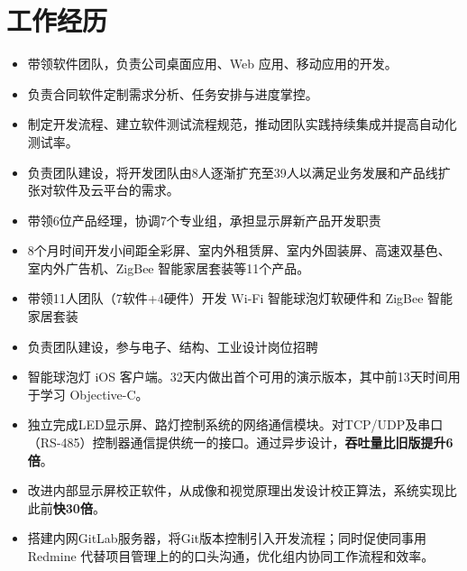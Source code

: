 \documentclass[11pt,a4paper]{moderncv/moderncv}
\begin{document}
\maketitle


\section{工作经历}

{
\begin{itemize}
	\item 带领软件团队，负责公司桌面应用、Web 应用、移动应用的开发。
	\item 负责合同软件定制需求分析、任务安排与进度掌控。
	\item 制定开发流程、建立软件测试流程规范，推动团队实践持续集成并提高自动化测试率。
	\item 负责团队建设，将开发团队由8人逐渐扩充至39人以满足业务发展和产品线扩张对软件及云平台的需求。
\end{itemize}
}

{
\begin{itemize}
	\item 带领6位产品经理，协调7个专业组，承担显示屏新产品开发职责
	\item 8个月时间开发小间距全彩屏、室内外租赁屏、室内外固装屏、高速双基色、室内外广告机、ZigBee 智能家居套装等11个产品。
	\item 带领11人团队（7软件+4硬件）开发 Wi-Fi 智能球泡灯软硬件和 ZigBee 智能家居套装
	\item 负责团队建设，参与电子、结构、工业设计岗位招聘
\end{itemize}
}

{
\begin{itemize}
	\item 智能球泡灯 iOS 客户端。32天内做出首个可用的演示版本，其中前13天时间用于学习 Objective-C。
	\item 独立完成LED显示屏、路灯控制系统的网络通信模块。对TCP/UDP及串口（RS-485）控制器通信提供统一的接口。通过异步设计，\textbf{吞吐量比旧版提升6倍}。
	\item 改进内部显示屏校正软件，从成像和视觉原理出发设计校正算法，系统实现比此前\textbf{快30倍}。
	\item 搭建内网GitLab服务器，将Git版本控制引入开发流程；同时促使同事用 Redmine 代替项目管理上的的口头沟通，优化组内协同工作流程和效率。
\end{itemize}
}
\end{document}
